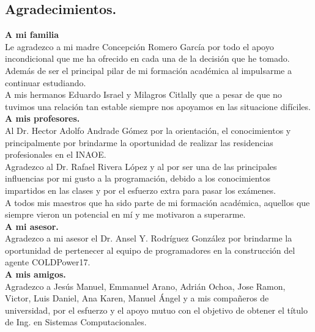 \begin{center}
	\section*{Agradecimientos.}   
\end{center}
\setcounter{page}{1}

\textbf{A mi familia}
\\

Le agradezco a mi madre Concepción Romero García por todo el apoyo incondicional que me ha ofrecido en cada una de la decisión que he tomado. Además de ser el principal pilar de mi formación académica al impulsarme a continuar estudiando.
\\

A mis hermanos Eduardo Israel y Milagros Citlally que a pesar de que no tuvimos una relación tan estable siempre nos apoyamos en las situacione difíciles.
\\

\textbf{A mis profesores.}
\\

Al Dr. Hector Adolfo Andrade Gómez por la orientación, el conocimientos  y principalmente por brindarme la oportunidad de realizar las residencias profesionales en el INAOE.
\\

Agradezco al Dr. Rafael Rivera López y al por ser una de las principales influencias por mi gusto a la programación, debido a los conocimientos impartidos en las clases y por el esfuerzo extra para pasar los exámenes.
\\

A todos mis maestros que ha sido parte de mi formación académica, aquellos que siempre vieron un potencial en mí y me motivaron a superarme.
\\

\textbf{A mi asesor.}
\\

Agradezco a mi asesor el Dr. Ansel Y. Rodríguez González por brindarme la oportunidad de pertenecer al equipo de programadores en la construcción del agente COLDPower17.
\\

\textbf{A mis amigos.}
\\

Agradezco a  Jesús Manuel, Emmanuel Arano, Adrián Ochoa, Jose Ramon, Victor, Luis Daniel, Ana Karen, Manuel Ángel y a mis compañeros de universidad, por el esfuerzo y el apoyo mutuo con el objetivo de obtener el título de Ing. en Sistemas Computacionales.
\\